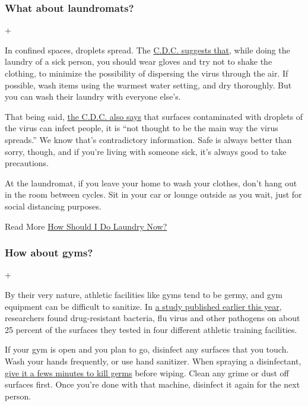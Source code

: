 \hypertarget{what-about-laundromats}{%
\subsubsection{What about laundromats?}\label{what-about-laundromats}}

+

In confined spaces, droplets spread. The
\href{https://www.cdc.gov/coronavirus/2019-ncov/prevent-getting-sick/cleaning-disinfection.html}{C.D.C.
suggests that}, while doing the laundry of a sick person, you should
wear gloves and try not to shake the clothing, to minimize the
possibility of dispersing the virus through the air. If possible, wash
items using the warmest water setting, and dry thoroughly. But you can
wash their laundry with everyone else's.

That being said,
\href{https://www.nytimes3xbfgragh.onion/2020/05/22/health/cdc-coronavirus-touching-surfaces.html}{the
C.D.C. also says} that surfaces contaminated with droplets of the virus
can infect people, it is ``not thought to be the main way the virus
spreads.'' We know that's contradictory information. Safe is always
better than sorry, though, and if you're living with someone sick, it's
always good to take precautions.

At the laundromat, if you leave your home to wash your clothes, don't
hang out in the room between cycles. Sit in your car or lounge outside
as you wait, just for social distancing purposes.

Read More
\href{https://www.nytimes3xbfgragh.onion/2020/03/26/style/how-to-do-laundry-coronavirus.html}{How
Should I Do Laundry Now?}

\hypertarget{how-about-gyms}{%
\subsubsection{How about gyms?}\label{how-about-gyms}}

+

By their very nature, athletic facilities like gyms tend to be germy,
and gym equipment can be difficult to sanitize. In
\href{https://pubmed.ncbi.nlm.nih.gov/31660785/}{a study published
earlier this year}, researchers found drug-resistant bacteria, flu virus
and other pathogens on about 25 percent of the surfaces they tested in
four different athletic training facilities.

If your gym is open and you plan to go, disinfect any surfaces that you
touch. Wash your hands frequently, or use hand sanitizer. When spraying
a disinfectant,
\href{https://www.nytimes3xbfgragh.onion/2020/05/06/well/live/coronavirus-cleaning-cleaners-disinfectants-home.html}{give
it a fews minutes to kill germs} before wiping. Clean any grime or dust
off surfaces first. Once you're done with that machine, disinfect it
again for the next person.

